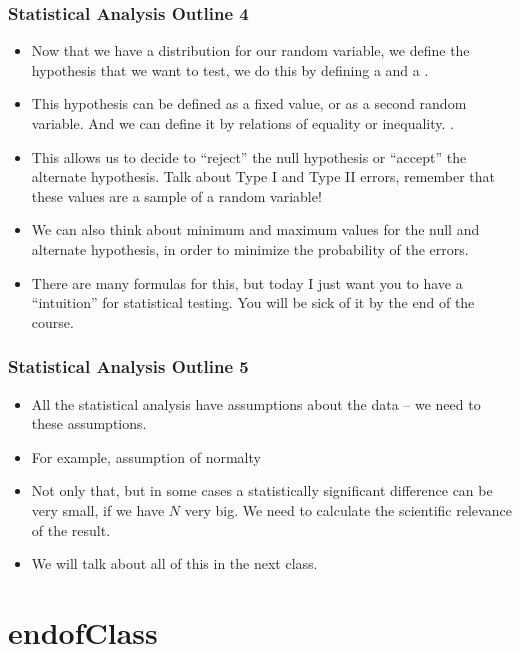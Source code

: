 \documentclass{beamer}
\begin{document}
\begin{frame}
  \frametitle{Statistical Analysis Outline 4}
  \begin{itemize}
  \item Now that we have a distribution for our random variable, we
    define the hypothesis that we want to test, we do this by defining
    a  and a .
  \item This hypothesis can be defined as a fixed value, or as a
    second random variable. And we can define it by relations of
    equality or inequality. . 
  \item This allows us to decide to ``reject'' the null hypothesis or
    ``accept'' the alternate hypothesis. Talk about Type I and Type II
    errors, remember that these values are a sample of a random
    variable!
  \item We can also think about minimum and maximum values for the
    null and alternate hypothesis, in order to minimize the
    probability of the errors.
  \item There are many formulas for this, but today I just want you
    to have a ``intuition'' for statistical testing. You will be
    sick of it by the end of the course.
  \end{itemize}
\end{frame}

\begin{frame}
  \frametitle{Statistical Analysis Outline 5}
  \begin{itemize}
  \item All the statistical analysis have assumptions about the data
    -- we need to  these assumptions.
  \item For example, assumption of normalty
  \item Not only that, but in some cases a statistically significant
    difference can be very small, if we have $N$ very big. We need to
    calculate the scientific relevance of the result.
  \item We will talk about all of this in the next class.
  \end{itemize}
\end{frame}


\section{endofClass}
\end{document}
